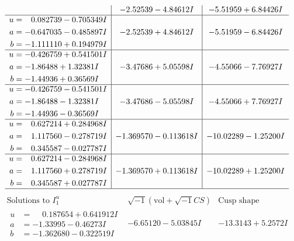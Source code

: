 \documentclass[1p]{elsarticle_modified}
\theoremstyle{definition}
\newcommand{\I}{\sqrt{-1}}
\begin{document}
$$\begin{array}{c|c|c}
 & -2.52539 - 4.84612 I & -5.51959 + 6.84426 I \\ \hline\begin{aligned}
u &= \phantom{-}0.082739 - 0.705349 I \\
a &= -0.647035 - 0.485897 I \\
b &= -1.111110 + 0.194979 I\end{aligned}
 & -2.52539 + 4.84612 I & -5.51959 - 6.84426 I \\ \hline\begin{aligned}
u &= -0.426759 + 0.541501 I \\
a &= -1.86488 + 1.32381 I \\
b &= -1.44936 + 0.36569 I\end{aligned}
 & -3.47686 + 5.05598 I & -4.55066 - 7.76927 I \\ \hline\begin{aligned}
u &= -0.426759 - 0.541501 I \\
a &= -1.86488 - 1.32381 I \\
b &= -1.44936 - 0.36569 I\end{aligned}
 & -3.47686 - 5.05598 I & -4.55066 + 7.76927 I \\ \hline\begin{aligned}
u &= \phantom{-}0.627214 + 0.284968 I \\
a &= \phantom{-}1.117560 - 0.278719 I \\
b &= \phantom{-}0.345587 - 0.027787 I\end{aligned}
 & -1.369570 - 0.113618 I & -10.02289 - 1.25200 I \\ \hline\begin{aligned}
u &= \phantom{-}0.627214 - 0.284968 I \\
a &= \phantom{-}1.117560 + 0.278719 I \\
b &= \phantom{-}0.345587 + 0.027787 I\end{aligned}
 & -1.369570 + 0.113618 I & -10.02289 + 1.25200 I\\
 \hline 
 \end{array}$$\newpage$$\begin{array}{c|c|c}  
\text{Solutions to }I^u_{1}& \I (\text{vol} + \sqrt{-1}CS) & \text{Cusp shape}\\
 \hline 
\begin{aligned}
u &= \phantom{-}0.187654 + 0.641912 I \\
a &= -1.33995 - 0.46273 I \\
b &= -1.362680 - 0.322519 I\end{aligned}
 & -6.65120 - 5.03845 I & -13.3143 + 5.2572 I \\ \hline\begin{aligned}

\end{aligned}
\end{array}$$
\end{document}

